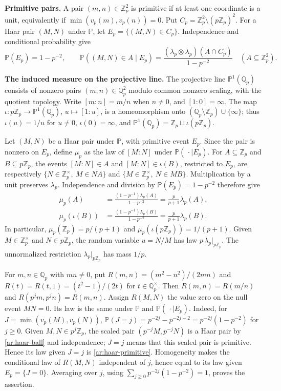\documentclass[twoside]{aomart}
\theoremstyle{paperplain}
\theoremstyle{paperdefinition}
\newcommand{\Z}{\mathbb Z}
\newcommand{\Q}{\mathbb Q}
\newcommand{\Pp}{\mathbb P}
\numberwithin{equation}{section}
\begin{document}
\par\smallskip\noindent\textbf{Primitive pairs.}
A pair $(m,n)\in\Z_p^2$ is primitive if at least one
coordinate is a unit, equivalently if
$\min(v_p(m),v_p(n))=0$. Put
$C_p=\Z_p^2\setminus(p\Z_p)^2$. For a Haar pair $(M,N)$
under $\Pp$, let $E_p=\{(M,N)\in C_p\}$.
Independence and conditional probability give
\begin{equation}
 \Pp(E_p)=1-p^{-2},\qquad
 \Pp((M,N)\in A\mid E_p)=\frac{(\lambda_p\otimes\lambda_p)(A\cap C_p)}{1-p^{-2}}\quad(A\subseteq\Z_p^2).
 \label{ar:haar-primitive}
\end{equation}
\par\smallskip\noindent\textbf{The induced measure on the projective line.}
The projective line $\mathbb P^1(\Q_p)$ consists of nonzero
pairs $(m,n)\in\Q_p^2$ modulo common nonzero scaling,
with the quotient topology. Write $[m:n]=m/n$ when
$n\ne0$, and $[1:0]=\infty$. The map
$\iota:p\Z_p\to\mathbb P^1(\Q_p)$, $u\mapsto[1:u]$,
is a homeomorphism onto $(\Q_p\setminus\Z_p)\cup\{\infty\}$;
thus $\iota(u)=1/u$ for $u\ne0$, $\iota(0)=\infty$, and
$\mathbb P^1(\Q_p)=\Z_p\sqcup\iota(p\Z_p)$.

Let $(M,N)$ be a Haar pair under $\Pp$, with primitive
event $E_p$. Since the pair is nonzero on $E_p$, define
$\mu_p$ as the law of $[M:N]$ under
$\Pp(\,\cdot\mid E_p)$. For $A\subseteq\Z_p$ and
$B\subseteq p\Z_p$, the events $[M:N]\in A$ and
$[M:N]\in\iota(B)$, restricted to $E_p$, are respectively
\mbox{$\{N\in\Z_p^\times,\ M\in NA\}$} and
\mbox{$\{M\in\Z_p^\times,\ N\in MB\}$}.
Multiplication by a unit preserves $\lambda_p$.
Independence and division by $\Pp(E_p)=1-p^{-2}$ therefore give
\begin{equation}
 \begin{aligned}
 \mu_p(A)&=\frac{(1-p^{-1})\lambda_p(A)}{1-p^{-2}}
          =\frac p{p+1}\lambda_p(A),\\
 \mu_p(\iota(B))&=\frac{(1-p^{-1})\lambda_p(B)}{1-p^{-2}}
          =\frac p{p+1}\lambda_p(B).
 \end{aligned}
 \label{ar:projective}
\end{equation}
In particular, $\mu_p(\Z_p)=p/(p+1)$ and
$\mu_p(\iota(p\Z_p))=1/(p+1)$.
Given $M\in\Z_p^\times$ and $N\in p\Z_p$, the random
variable $u=N/M$ has law $p\,\lambda_p|_{p\Z_p}$.
The unnormalized restriction $\lambda_p|_{p\Z_p}$ has mass $1/p$.

For $m,n\in\Q_p$ with $mn\ne0$, put
$R(m,n)=(m^2-n^2)/(2mn)$ and
$R(t)=R(t,1)=(t^2-1)/(2t)$ for $t\in\Q_p^\times$.
Then $R(m,n)=R(m/n)$ and $R(p^jm,p^jn)=R(m,n)$.
Assign $R(M,N)$ the value zero on the null event $MN=0$.
Its law is the same under $\Pp$ and
$\Pp(\,\cdot\mid E_p)$. Indeed, for
$J=\min(v_p(M),v_p(N))$,
$\Pp(J=j)=p^{-2j}-p^{-2j-2}=p^{-2j}(1-p^{-2})$
for $j\ge0$.
Given $M,N\in p^j\Z_p$, the scaled pair
$(p^{-j}M,p^{-j}N)$ is a Haar pair by
\eqref{ar:haar-ball} and independence; $J=j$ means that this
scaled pair is primitive. Hence its law given $J=j$ is
\eqref{ar:haar-primitive}. Homogeneity makes the conditional
law of $R(M,N)$ independent of $j$, hence equal to its
law given $E_p=\{J=0\}$. Averaging over $j$, using
$\displaystyle \sum_{j\ge0}p^{-2j}(1-p^{-2})=1$, proves the assertion.
\end{document}
